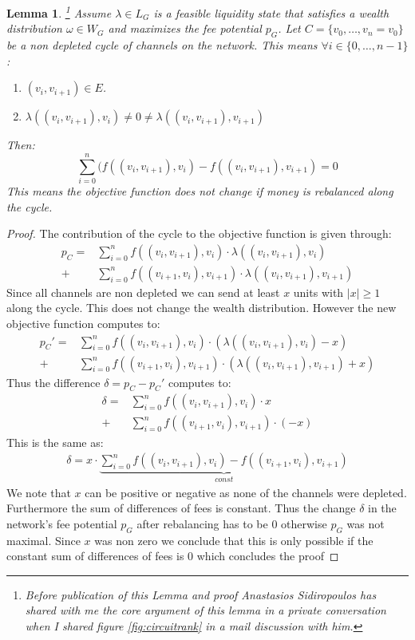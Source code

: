 \documentclass[10pt,twocolumn]{article}
\newtheorem{lemma}[theorem]{Lemma}
\begin{document}
\begin{lemma}\footnote{Before publication of this Lemma and proof Anastasios Sidiropoulos has shared with me the core argument of this lemma in a private conversation when I shared figure \ref{fig:circuitrank} in a mail discussion with him.}
  \label{lem:differenceOfFeesDepletion}
  Assume $\lambda\in L_G$ is a feasible liquidity state that satisfies a wealth distribution $\omega\in W_G$ and maximizes the fee potential $p_G$.
  Let $C=\{v_0,\dots,v_n=v_0\}$ be a non depleted cycle of channels on the network. This means $\forall i\in\{0,\dots,n-1\}$:
  \begin{enumerate}
  \item $(v_i,v_{i+1})\in E $.
  \item $\lambda((v_i,v_{i+1}),v_i)\neq 0 \neq \lambda((v_{i},v_{i+1}),v_{i+1})$
  \end{enumerate}
  Then:
  \[
  \sum_{i=0}^{n} ( f((v_i, v_{i+1}),v_i) - f((v_i, v_{i+1}),v_{i+1}) = 0
  \]
  This means the objective function does not change if money is rebalanced along the cycle.
\end{lemma}
\begin{proof}
  The contribution of the cycle to the objective function is given through:
    \begin{align*}
      p_C = & \sum_{i=0}^{n} f((v_i, v_{i+1}),v_i) \cdot \lambda((v_i,v_{i+1}),v_i)  \\
      + & \sum_{i=0}^{n} f((v_{i+1}, v_{i}),v_{i+1}) \cdot  \lambda((v_i,v_{i+1}),v_{i+1})
    \end{align*}
    Since all channels are non depleted we can send at least $x$ units with $|x|\geq 1$ along the cycle.
    This does not change the wealth distribution.
    However the new objective function computes to:
    \begin{align*}
      p_C' = & \sum_{i=0}^{n} f((v_i, v_{i+1}),v_i) \cdot (\lambda((v_i,v_{i+1}),v_i)-x)  \\
      + & \sum_{i=0}^{n} f((v_{i+1}, v_{i}),v_{i+1}) \cdot  (\lambda((v_i,v_{i+1}),v_{i+1})+x)
    \end{align*}
    Thus the difference $\delta = p_C - p_C'$ computes to:
    \begin{align*}
      \delta = & \sum_{i=0}^{n} f((v_i, v_{i+1}),v_i) \cdot x  \\
      + & \sum_{i=0}^{n} f((v_{i+1}, v_{i}),v_{i+1}) \cdot (-x)
    \end{align*}
    This is the same as:
    \begin{align*}
      \delta = x \cdot \underbrace{\sum_{i=0}^{n} f((v_i, v_{i+1}),v_i) - f((v_{i+1}, v_{i}),v_{i+1})}_{const}
    \end{align*}
    We note that $x$ can be positive or negative as none of the channels were depleted.
    Furthermore the sum of differences of fees is constant.
    Thus the change $\delta$ in the network's fee potential $p_G$ after rebalancing has to be $0$ otherwise $p_G$ was not maximal.
    Since $x$ was non zero we conclude that this is only possible if the constant sum of differences of fees is $0$ which concludes the proof
\end{proof}
\end{document}
